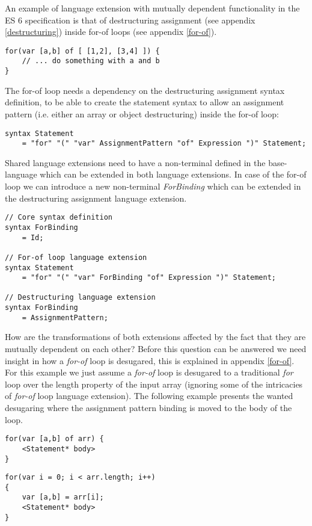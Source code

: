 An example of language extension with mutually dependent functionality in the ES 6 specification is that of destructuring assignment (see appendix \ref{destructuring}) inside for-of loops (see appendix \ref{for-of}).

\begin{lstlisting}
for(var [a,b] of [ [1,2], [3,4] ]) {
	// ... do something with a and b
}
\end{lstlisting}

The for-of loop needs a dependency on the destructuring assignment syntax definition, to be able to create the statement syntax to allow an assignment pattern (i.e. either an array or object destructuring) inside the for-of loop:

\begin{lstlisting}[language=rascal]
syntax Statement
	= "for" "(" "var" AssignmentPattern "of" Expression ")" Statement;
\end{lstlisting}

Shared language extensions need to have a non-terminal defined in the base-language which can be extended in both language extensions. In case of the for-of loop we can introduce a new non-terminal \textit{ForBinding} which can be extended in the destructuring assignment language extension.

\begin{lstlisting}[language=rascal]
// Core syntax definition
syntax ForBinding
	= Id;

// For-of loop language extension
syntax Statement
	= "for" "(" "var" ForBinding "of" Expression ")" Statement;

// Destructuring language extension
syntax ForBinding
	= AssignmentPattern;
\end{lstlisting}

How are the transformations of both extensions affected by the fact that they are mutually dependent on each other? Before this question can be answered we need insight in how a \textit{for-of} loop is desugared, this is explained in appendix \ref{for-of}. For this example we just assume a \textit{for-of} loop is desugared to a traditional \textit{for} loop over the length property of the input array (ignoring some of the intricacies of \textit{for-of} loop language extension). The following example presents the wanted desugaring where the assignment pattern binding is moved to the body of the loop. 

\begin{minipage}{0.45\linewidth}
\begin{lstlisting}
for(var [a,b] of arr) {
	<Statement* body>
}
\end{lstlisting}
\end{minipage}
\hfill
\begin{minipage}{0.5\linewidth}
\begin{lstlisting}
for(var i = 0; i < arr.length; i++) 
{	
	var [a,b] = arr[i];
	<Statement* body>
}
\end{lstlisting}
\end{minipage}

